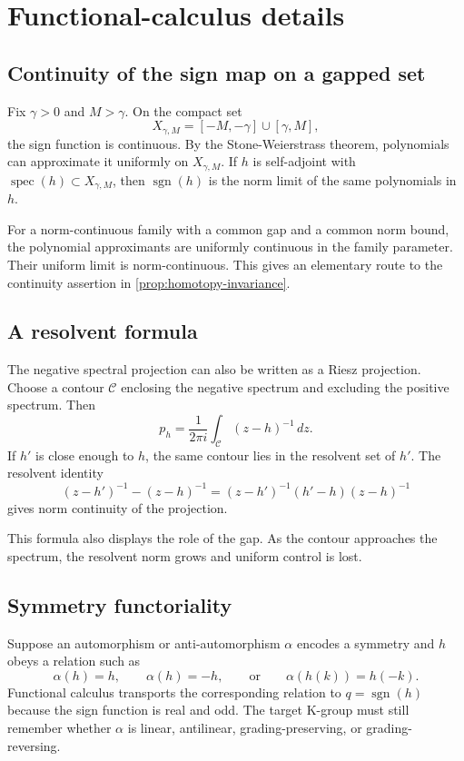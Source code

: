 \documentclass[12pt]{article}
\theoremstyle{definition}
\theoremstyle{remark}
\newcommand{\spec}{\operatorname{spec}}
\newcommand{\sgn}{\operatorname{sgn}}
\begin{document}
\appendix

\section{Functional-calculus details}

\subsection{Continuity of the sign map on a gapped set}

Fix $\gamma>0$ and $M>\gamma$.
On the compact set
\[
X_{\gamma,M}
=
[-M,-\gamma]\cup[\gamma,M],
\]
the sign function is continuous.
By the Stone-Weierstrass theorem, polynomials can approximate it uniformly on
$X_{\gamma,M}$.
If $h$ is self-adjoint with
$\spec(h)\subset X_{\gamma,M}$, then
$\sgn(h)$ is the norm limit of the same polynomials in $h$.

For a norm-continuous family with a common gap and a common norm bound, the
polynomial approximants are uniformly continuous in the family parameter.
Their uniform limit is norm-continuous.
This gives an elementary route to the continuity assertion in
\cref{prop:homotopy-invariance}.

\subsection{A resolvent formula}

The negative spectral projection can also be written as a Riesz projection.
Choose a contour $\mathcal C$ enclosing the negative spectrum and excluding
the positive spectrum.
Then
\[
p_h
=
\frac{1}{2\pi i}
\int_{\mathcal C}(z-h)^{-1}\,dz.
\]
If $h'$ is close enough to $h$, the same contour lies in the resolvent set of
$h'$.
The resolvent identity
\[
(z-h')^{-1}-(z-h)^{-1}
=
(z-h')^{-1}(h'-h)(z-h)^{-1}
\]
gives norm continuity of the projection.

This formula also displays the role of the gap.
As the contour approaches the spectrum, the resolvent norm grows and uniform
control is lost.

\subsection{Symmetry functoriality}

Suppose an automorphism or anti-automorphism $\alpha$ encodes a symmetry and
$h$ obeys a relation such as
\[
\alpha(h)=h,
\qquad
\alpha(h)=-h,
\qquad\text{or}\qquad
\alpha(h(k))=h(-k).
\]
Functional calculus transports the corresponding relation to $q=\sgn(h)$
because the sign function is real and odd.
The target K-group must still remember whether $\alpha$ is linear,
antilinear, grading-preserving, or grading-reversing.
\end{document}
